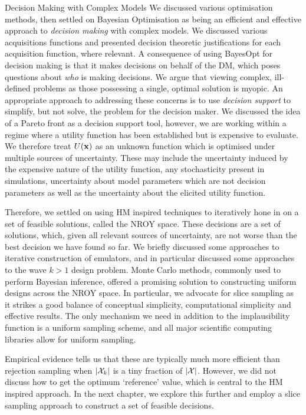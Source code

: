 \begin{chapter}{Decision Making with Complex Models \label{Chap:optimisation}}
We discussed various optimisation methods, then settled on Bayesian Optimisation as being an efficient and effective approach to \textit{decision making} with complex models. We discussed various acquisitions functions and presented decision theoretic justifications for each acquisition function, where relevant. A consequence of using BayesOpt for decision making is that it makes decisions on behalf of the DM, which poses questions about \emph{who} is making decisions. We argue that viewing complex, ill-defined problems as those possessing a single, optimal solution is myopic. An appropriate approach to addressing these concerns is to use \textit{decision support} to simplify, but not solve, the problem for the decision maker. We discussed the idea of a Pareto front as a decision support tool, however, we are working within a regime where a utility function has been established but is expensive to evaluate. We therefore treat $U(\mathbf{x})$ as an unknown function which is optimised under multiple sources of uncertainty. These may include the uncertainty induced by the expensive nature of the utility function, any stochasticity present in simulations, uncertainty about model parameters which are not decision parameters as well as the uncertainty about the elicited utility function.

Therefore, we settled on using HM inspired techniques to iteratively hone in on a set of feasible solutions, called the NROY space. These decisions are a set of solutions, which, given all relevant sources of uncertainty, are not worse than the best decision we have found so far. We briefly discussed some approaches to iterative construction of emulators, and in particular discussed some approaches to the wave $k>1$ design problem. Monte Carlo methods, commonly used to perform Bayesian inference, offered a promising solution to constructing uniform designs across the NROY space. In particular, we advocate for slice sampling as it strikes a good balance of conceptual simplicity, computational simplicity and effective results. The only mechanism we need in addition to the implausibility function is a uniform sampling scheme, and all major scientific computing libraries allow for uniform sampling.

Empirical evidence tells us that these are typically much more efficient than rejection sampling when $|\mathcal{X}_k|$ is a tiny fraction of $|\mathcal{X}|$. However, we did not discuss how to get the optimum `reference' value, which is central to the HM inspired approach. In the next chapter, we explore this further and employ a slice sampling approach to construct a set of feasible decisions.
\end{chapter}
